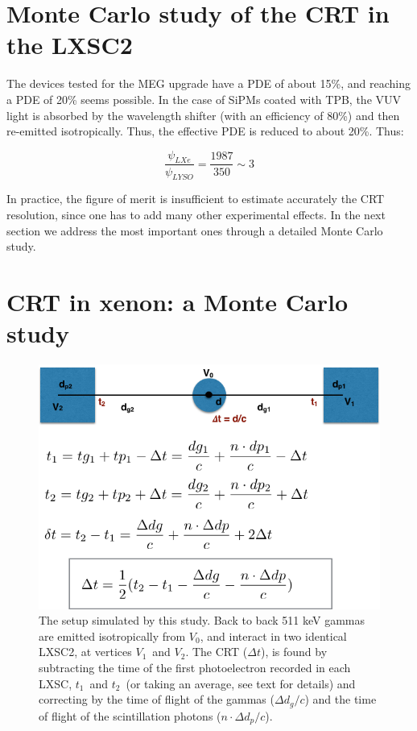 \documentclass[review]{elsarticle}
\begin{document}
\section{Monte Carlo study of the CRT in the LXSC2} The devices tested for the MEG upgrade have a PDE of about 15\%, and reaching a PDE of 20\% seems possible. In the case of SiPMs coated with TPB, the VUV light is absorbed by the wavelength shifter (with an efficiency of 80\%) and then re-emitted isotropically. Thus, the effective PDE is reduced to about 20\%. Thus:

 \begin{equation}
\frac{\psi_{LXe}}{\psi_{LYSO}} = \frac{1987}{350} \sim 3
\label{eq.ratioScint}
\end{equation}

In practice, the figure of merit is insufficient to estimate accurately the CRT resolution, since one has to add many other experimental effects. In the next section we address the most important ones through a detailed Monte Carlo study. 

\section{CRT in xenon: a Monte Carlo study}
\label{sec.CRT}

\begin{figure}[!bhtp]
	\centering
	\includegraphics[scale=0.5]{../img/TOFSetup.png}
	\caption{The setup simulated by this study. Back to back 511 keV gammas are emitted
	isotropically from $V_0$, and interact in two identical LXSC2, at vertices $V_1$~and
	$V_2$. The CRT ($\Delta t$), is found by subtracting the time of the first photoelectron recorded
	in each LXSC, $t_1$~and $t_2$~(or taking an average, see text for details) and correcting
	by the time of flight of the gammas ($\Delta d_g/c$) and the time of flight of the scintillation photons
	($n \cdot \Delta d_p/c$). }\label{fig.setup} 
\end{figure}  
\end{document}
